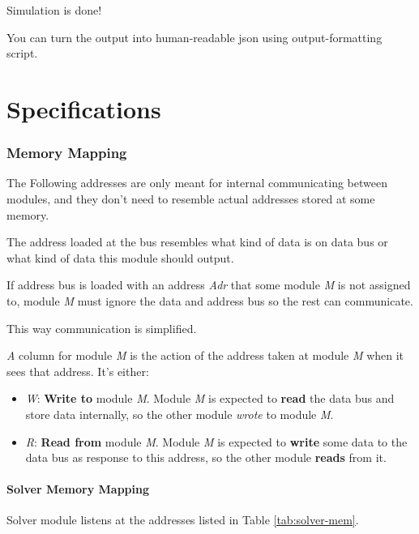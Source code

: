 \documentclass[12pt]{report}
\begin{document}
Simulation is done! 

You can turn the output into human-readable json using output-formatting script.

\part{Specifications}

\section{Memory Mapping}
The Following addresses are only meant for internal communicating between modules, and they don't need to resemble actual addresses stored at some memory. 

The address loaded at the bus resembles what kind of data is on data bus or what kind of data this module should output.

If address bus is loaded with an address \emph{Adr} that some module \emph{M} is not assigned to, module \emph{M} must ignore the data and address bus so the rest can communicate.

This way communication is simplified.

\emph{A} column for module \emph{M} is the action of the address taken at module \emph{M} when it sees that address. It's either:

\begin{itemize}
    \item \emph{W}: \textbf{Write to} module \emph{M}. Module \emph{M} is expected to \textbf{read} the data bus and store data internally, so the other module \emph{wrote} to module \emph{M}.
    \item \emph{R}: \textbf{Read from} module \emph{M}. Module \emph{M} is expected to \textbf{write} some data to the data bus as response to this address, so the other module \textbf{reads} from it.
\end{itemize}

\subsection{Solver Memory Mapping}
Solver module listens at the addresses listed in Table \ref{tab:solver-mem}.
\end{document}
